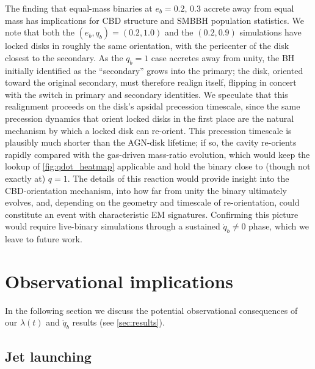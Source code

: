 \documentclass[fleqn,usenatbib]{mnras}
\begin{document}
The finding that equal-mass binaries at $e_b = 0.2, \, 0.3$ accrete away from equal mass has implications for CBD structure and SMBBH population statistics. We note that both the $(e_b, q_b) = (0.2, 1.0)$ and the $(0.2, 0.9)$ simulations have locked disks in roughly the same orientation, with the pericenter of the disk closest to the secondary. As the $q_b = 1$ case accretes away from unity, the BH initially identified as the ``secondary'' grows into the primary; the disk, oriented toward the original secondary, must therefore realign itself, flipping in concert with the switch in primary and secondary identities. We speculate that this realignment proceeds on the disk's apsidal precession timescale, since the same precession dynamics that orient locked disks in the first place are the natural mechanism by which a locked disk can re-orient. This precession timescale is plausibly much shorter than the AGN-disk lifetime; if so, the cavity re-orients rapidly compared with the gas-driven mass-ratio evolution, which would keep the lookup of \autoref{fig:qdot_heatmap} applicable and hold the binary close to (though not exactly at) $q = 1$. The details of this reaction would provide insight into the CBD-orientation mechanism, into how far from unity the binary ultimately evolves, and, depending on the geometry and timescale of re-orientation, could constitute an event with characteristic EM signatures. Confirming this picture would require live-binary simulations through a sustained $\dot{q}_b \neq 0$ phase, which we leave to future work.

\section{Observational implications}\label{sec:observations}
In the following section we discuss the potential observational consequences of our $\lambda(t)$ and $\dot{q}_b$ results (see \autoref{sec:results}).

\subsection{Jet launching}
\end{document}
